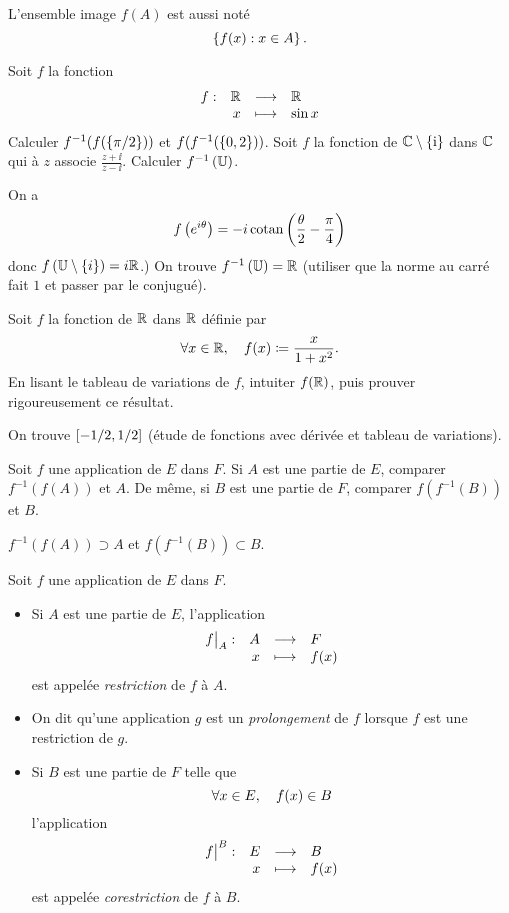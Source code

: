 \documentclass{magnolia}
\begin{document}
\begin{remarqueUnique}
\remarque L'ensemble image $f(A)$ est aussi noté
  \[\left\{f(x) : x\in A\right\}.\]
\end{remarqueUnique}

\begin{exos}
\exo Soit $f$ la fonction
  \[\begin{array}[t]{lrcl} \displaystyle{f} : & \displaystyle{\mathbb{R}} & \longrightarrow & \displaystyle{\mathbb{R}} \\ & \displaystyle{x} & \longmapsto & \displaystyle{\sin x} \end{array}\]
  Calculer $f^{-1}(f(\left\{\pi/2\right\}))$ et $f(f^{-1}(\left\{0, 2\right\}))$.
\exo Soit $f$ la fonction de $\mathbb{C}\setminus\left\{{\rm i}\right\}$ dans $\mathbb{C}$ qui à $z$
  associe $\frac{z+\ii}{z-\ii}$. Calculer %
  $f^\applirec \p{\U}$.
  \begin{sol}
  On a
  \[f\left(e^{i\theta}\right)=-i\operatorname{cotan}\left(\frac{\theta}{2}-\frac{\pi}{4}\right)\]
  donc $f\p{\U\setminus\ens{i}}=i\R$.) On trouve $f^\applirec \p{\U}=\R$
  (utiliser que la norme au carré fait $1$ et passer par le conjugué).
  \end{sol}
\exo Soit $f$ la fonction de $\mathbb{R}$ dans $\mathbb{R}$ définie par
  \[\forall x\in\mathbb{R} ,\quad f(x)\coloneqq\frac{x}{1+x^2}.\]
  En lisant le tableau de variations de $f$, intuiter $f(\mathbb{R})$, puis
  prouver rigoureusement ce résultat.
  \begin{sol}
  On trouve $\left[-1/2,1/2\right]$ (étude de fonctions avec dérivée et tableau de variations).
  \end{sol}
\exo Soit $f$ une application de $E$ dans $F$. Si $A$ est une partie de $E$,
  comparer $f^{-1}(f(A))$ et $A$. De même, si $B$ est une partie de $F$,
  comparer $f(f^{-1}(B))$ et $B$.  
 \begin{sol}
 $f^{-1}(f(A))\supset A$ et $f(f^{-1}(B))\subset B$.
 \end{sol}
\end{exos}


\begin{definition}[utile=-3]
Soit $f$ une application de $E$ dans $F$.
\begin{itemize}
\item Si $A$ est une partie de $E$, l'application
  \[\dspappli{\restri{f}{A}}{A}{F}{x}{f(x)}\]
  est appelée \emph{restriction} de $f$ à $A$.
\item On dit qu'une application $g$ est un
  \emph{prolongement} de $f$ lorsque $f$ est une restriction de $g$.
\item Si $B$ est une partie de $F$ telle que
  \[\forall x\in E ,\quad f(x)\in B\]
  l'application
  \[\dspappli{\corestri{f}{B}}{E}{B}{x}{f(x)}\]
  est appelée \emph{corestriction} de $f$ à $B$.
\end{itemize}
\end{definition}
\end{document}
